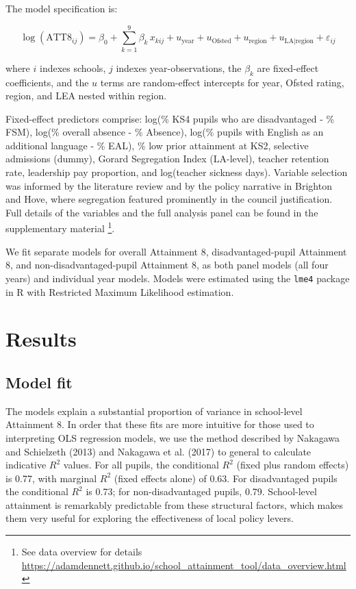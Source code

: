 \documentclass[
  12pt,
  titlepage]{article}
\begin{document}
The model specification is:

\[
\log(\text{ATT8}_{ij}) = \beta_0 + \sum_{k=1}^{9} \beta_k \, x_{kij} + u_{\text{year}} + u_{\text{Ofsted}} + u_{\text{region}} + u_{\text{LA|region}} + \varepsilon_{ij}
\]

where \(i\) indexes schools, \(j\) indexes year-observations, the
\(\beta_k\) are fixed-effect coefficients, and the \(u\) terms are
random-effect intercepts for year, Ofsted rating, region, and LEA nested
within region.

Fixed-effect predictors comprise: log(\% KS4 pupils who are
disadvantaged - \% FSM), log(\% overall absence - \% Absence), log(\%
pupils with English as an additional language - \% EAL), \% low prior
attainment at KS2, selective admissions (dummy), Gorard Segregation
Index (LA-level), teacher retention rate, leadership pay proportion, and
log(teacher sickness days). Variable selection was informed by the
literature review and by the policy narrative in Brighton and Hove,
where segregation featured prominently in the council justification.
Full details of the variables and the full analysis panel can be found
in the supplementary material \footnote{See data overview for details
  \url{https://adamdennett.github.io/school_attainment_tool/data_overview.html}}.

We fit separate models for overall Attainment 8, disadvantaged-pupil
Attainment 8, and non-disadvantaged-pupil Attainment 8, as both panel
models (all four years) and individual year models. Models were
estimated using the \texttt{lme4} package in R with Restricted Maximum
Likelihood estimation.

\section{Results}\label{results}

\subsection{Model fit}\label{model-fit}

The models explain a substantial proportion of variance in school-level
Attainment 8. In order that these fits are more intuitive for those used
to interpreting OLS regression models, we use the method described by
Nakagawa and Schielzeth (2013) and Nakagawa et al. (2017) to general to
calculate indicative \(R^2\) values. For all pupils, the conditional
\(R^2\) (fixed plus random effects) is 0.77, with marginal \(R^2\)
(fixed effects alone) of 0.63. For disadvantaged pupils the conditional
\(R^2\) is 0.73; for non-disadvantaged pupils, 0.79. School-level
attainment is remarkably predictable from these structural factors,
which makes them very useful for exploring the effectiveness of local
policy levers.
\end{document}
